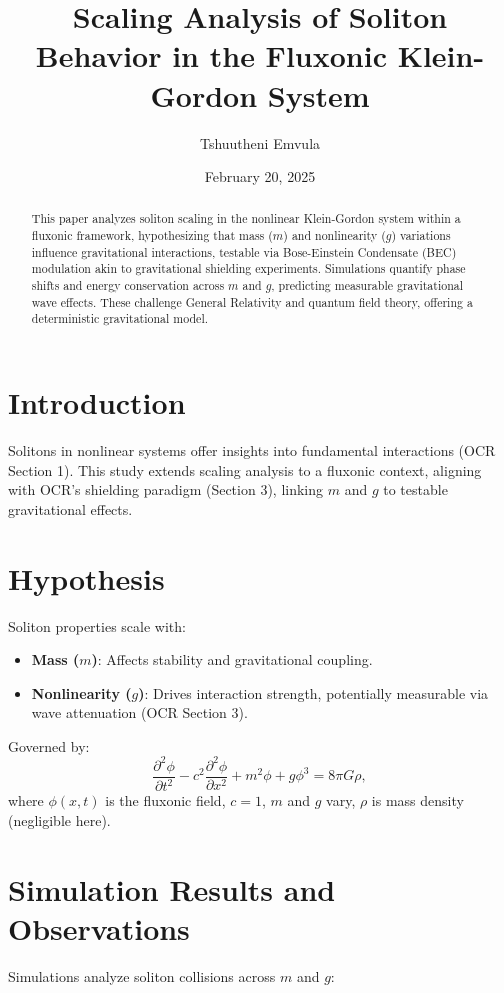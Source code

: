 \documentclass{article}
\title{Scaling Analysis of Soliton Behavior in the Fluxonic Klein-Gordon System}
\author{Tshuutheni Emvula}
\date{February 20, 2025}
\begin{document}
\maketitle

\begin{abstract}
This paper analyzes soliton scaling in the nonlinear Klein-Gordon system within a fluxonic framework, hypothesizing that mass (\(m\)) and nonlinearity (\(g\)) variations influence gravitational interactions, testable via Bose-Einstein Condensate (BEC) modulation akin to gravitational shielding experiments. Simulations quantify phase shifts and energy conservation across \(m\) and \(g\), predicting measurable gravitational wave effects. These challenge General Relativity and quantum field theory, offering a deterministic gravitational model.
\end{abstract}

\section{Introduction}
Solitons in nonlinear systems offer insights into fundamental interactions (OCR Section 1). This study extends scaling analysis to a fluxonic context, aligning with OCR’s shielding paradigm (Section 3), linking \(m\) and \(g\) to testable gravitational effects.

\section{Hypothesis}
Soliton properties scale with:
\begin{itemize}
    \item \textbf{Mass (\(m\))}: Affects stability and gravitational coupling.
    \item \textbf{Nonlinearity (\(g\))}: Drives interaction strength, potentially measurable via wave attenuation (OCR Section 3).
\end{itemize}
Governed by:
\begin{equation}
\frac{\partial^2 \phi}{\partial t^2} - c^2 \frac{\partial^2 \phi}{\partial x^2} + m^2 \phi + g \phi^3 = 8 \pi G \rho,
\end{equation}
where \(\phi(x,t)\) is the fluxonic field, \(c = 1\), \(m\) and \(g\) vary, \(\rho\) is mass density (negligible here).

\section{Simulation Results and Observations}
Simulations analyze soliton collisions across \(m\) and \(g\):
\end{document}
